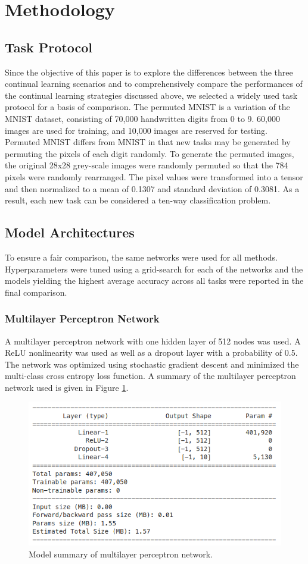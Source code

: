 \documentclass{article}
\begin{document}
\section{Methodology} \label{methodology}

\subsection{Task Protocol}
Since the objective of this paper is to explore the differences between the three continual learning scenarios and to comprehensively compare the performances of the continual learning strategies discussed above, we selected a widely used task protocol for a basis of comparison. The permuted MNIST is a variation of the MNIST dataset, consisting of 70,000 handwritten digits from 0 to 9. 60,000 images are used for training, and 10,000 images are reserved for testing. Permuted MNIST differs from MNIST in that new tasks may be generated by permuting the pixels of each digit randomly. To generate the permuted images, the original 28x28 grey-scale images were randomly permuted so that the 784 pixels were randomly rearranged. The pixel values were transformed into a tensor and then normalized to a mean of 0.1307 and standard deviation of 0.3081. As a result, each new task can be considered a ten-way classification problem.

\subsection{Model Architectures}
To ensure a fair comparison, the same networks were used for all methods. Hyperparameters were tuned using a grid-search for each of the networks and the models yielding the highest average accuracy across all tasks were reported in the final comparison.

\subsubsection{Multilayer Perceptron Network}
A multilayer perceptron network with one hidden layer of 512 nodes was used. A ReLU nonlinearity was used as well as a dropout layer with a probability of 0.5. The network was optimized using stochastic gradient descent and minimized the multi-class cross entropy loss function. A summary of the multilayer perceptron network used is given in Figure \ref{fig:MLP}.

\begin{figure}[h]
	\centering
    \includegraphics[width=0.60\linewidth]{MLP}
    \caption{Model summary of multilayer perceptron network.}
	\label{fig:MLP}
\end{figure}
\end{document}
